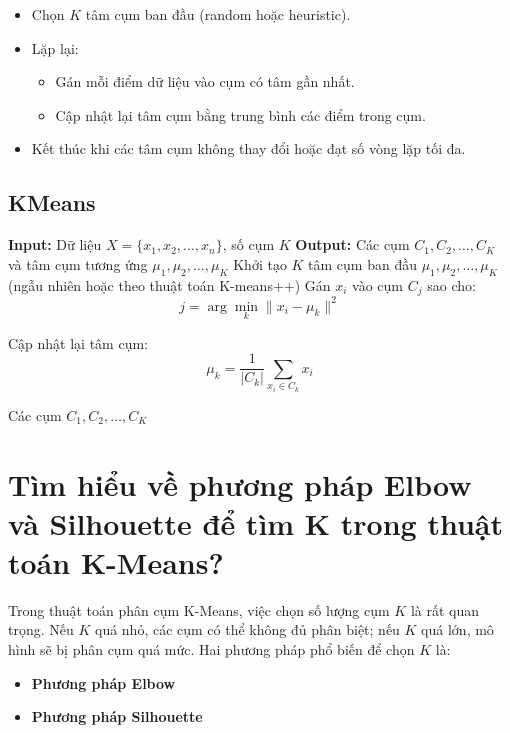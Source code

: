 \documentclass[12pt]{article}
\begin{document}
	\begin{itemize}
	\item Chọn $K$ tâm cụm ban đầu (random hoặc heuristic).
	\item Lặp lại:
	\begin{itemize}
	\item Gán mỗi điểm dữ liệu vào cụm có tâm gần nhất.
	\item Cập nhật lại tâm cụm bằng trung bình các điểm trong cụm.
	\end{itemize}
	\item Kết thúc khi các tâm cụm không thay đổi hoặc đạt số vòng lặp tối đa.
	\end{itemize}
	
	\subsection*{KMeans}
	
	\begin{algorithm}[H]
	\begin{algorithmic}[1]
	\State \textbf{Input:} Dữ liệu $X = \{x_1, x_2, \dots, x_n\}$, số cụm $K$
	\State \textbf{Output:} Các cụm $C_1, C_2, \dots, C_K$ và tâm cụm tương ứng $\mu_1, \mu_2, \dots, \mu_K$
	\State Khởi tạo $K$ tâm cụm ban đầu $\mu_1, \mu_2, \dots, \mu_K$ (ngẫu nhiên hoặc theo thuật toán K-means++)
	\Repeat
	\State Gán $x_i$ vào cụm $C_j$ sao cho:
	\[
	j = \arg\min_k \|x_i - \mu_k\|^2
	\]
	\EndFor
	
	\State Cập nhật lại tâm cụm:
	\[
	\mu_k = \frac{1}{|C_k|} \sum_{x_i \in C_k} x_i
	\]
	\EndFor
	
	\State \Return Các cụm $C_1, C_2, \dots, C_K$
	\end{algorithmic}
	\end{algorithm}
	
	\section{Tìm hiểu về phương pháp Elbow và Silhouette để tìm K trong thuật toán K-Means?}
	
	Trong thuật toán phân cụm K-Means, việc chọn số lượng cụm $K$ là rất quan trọng. Nếu $K$ quá nhỏ, các cụm có thể không đủ phân biệt; nếu $K$ quá lớn, mô hình sẽ bị phân cụm quá mức. Hai phương pháp phổ biến để chọn $K$ là:
	
	\begin{itemize}
	\item \textbf{Phương pháp Elbow}
	\item \textbf{Phương pháp Silhouette}
	\end{itemize}
	
\end{document}
